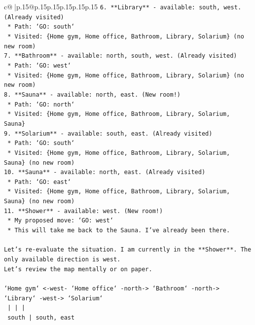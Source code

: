 \documentclass{article}
\begin{document}
{\begin{supertabular}{c@{$\;$}|p{.15\linewidth}@{}p{.15\linewidth}p{.15\linewidth}p{.15\linewidth}p{.15\linewidth}p{.15\linewidth}}
{{{\texttt{6.  **Library** {-} available: south, west. (Already visited)} \\
\texttt{    *   Path: `GO: south`} \\
\texttt{    *   Visited: \{Home gym, Home office, Bathroom, Library, Solarium\} (no new room)} \\
\texttt{7.  **Bathroom** {-} available: north, south, west. (Already visited)} \\
\texttt{    *   Path: `GO: west`} \\
\texttt{    *   Visited: \{Home gym, Home office, Bathroom, Library, Solarium\} (no new room)} \\
\texttt{8.  **Sauna** {-} available: north, east. (New room!)} \\
\texttt{    *   Path: `GO: north`} \\
\texttt{    *   Visited: \{Home gym, Home office, Bathroom, Library, Solarium, Sauna\}} \\
\texttt{9.  **Solarium** {-} available: south, east. (Already visited)} \\
\texttt{    *   Path: `GO: south`} \\
\texttt{    *   Visited: \{Home gym, Home office, Bathroom, Library, Solarium, Sauna\} (no new room)} \\
\texttt{10. **Sauna** {-} available: north, east. (Already visited)} \\
\texttt{    *   Path: `GO: east`} \\
\texttt{    *   Visited: \{Home gym, Home office, Bathroom, Library, Solarium, Sauna\} (no new room)} \\
\texttt{11. **Shower** {-} available: west. (New room!)} \\
\texttt{    *   My proposed move: `GO: west`} \\
\texttt{    *   This will take me back to the Sauna. I've already been there.} \\
\\ 
\texttt{Let's re{-}evaluate the situation. I am currently in the **Shower**. The only available direction is west.} \\
\texttt{Let's review the map mentally or on paper.} \\
\\ 
\texttt{`Home gym` <{-}west{-} `Home office` {-}north{-}> `Bathroom` {-}north{-}> `Library` {-}west{-}> `Solarium`} \\
\texttt{                         |                     |                      |} \\
\texttt{                      south                   |                    south, east} \\
}}}
\end{supertabular}}
\end{document}
